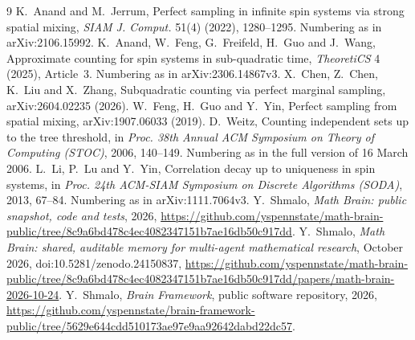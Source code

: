 \documentclass[11pt]{amsart}
\begin{document}
\begin{thebibliography}{9}
 K.~Anand and M.~Jerrum, Perfect sampling in infinite spin systems via strong spatial mixing, \emph{SIAM J. Comput.} 51(4) (2022), 1280--1295. Numbering as in arXiv:2106.15992.
 K.~Anand, W.~Feng, G.~Freifeld, H.~Guo and J.~Wang, Approximate counting for spin systems in sub-quadratic time, \emph{TheoretiCS} 4 (2025), Article~3. Numbering as in arXiv:2306.14867v3.
 X.~Chen, Z.~Chen, K.~Liu and X.~Zhang, Subquadratic counting via perfect marginal sampling, arXiv:2604.02235 (2026).
 W.~Feng, H.~Guo and Y.~Yin, Perfect sampling from spatial mixing, arXiv:1907.06033 (2019).
 D.~Weitz, Counting independent sets up to the tree threshold, in \emph{Proc. 38th Annual ACM Symposium on Theory of Computing (STOC)}, 2006, 140--149. Numbering as in the full version of 16 March 2006.
 L.~Li, P.~Lu and Y.~Yin, Correlation decay up to uniqueness in spin systems, in \emph{Proc. 24th ACM-SIAM Symposium on Discrete Algorithms (SODA)}, 2013, 67--84. Numbering as in arXiv:1111.7064v3.
 Y.~Shmalo, \emph{Math Brain: public snapshot, code and tests}, 2026, \url{https://github.com/yspennstate/math-brain-public/tree/8c9a6bd478c4ec4082347151b7ae16db50c917dd}.
 Y.~Shmalo, \emph{Math Brain: shared, auditable memory for multi-agent mathematical research}, October 2026, doi:10.5281/zenodo.24150837, \url{https://github.com/yspennstate/math-brain-public/tree/8c9a6bd478c4ec4082347151b7ae16db50c917dd/papers/math-brain-2026-10-24}.
 Y.~Shmalo, \emph{Brain Framework}, public software repository, 2026, \url{https://github.com/yspennstate/brain-framework-public/tree/5629e644cdd510173ae97e9aa92642dabd22dc57}.
\end{thebibliography}
\end{document}
